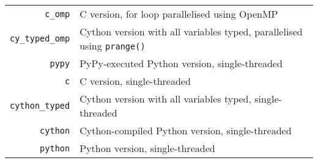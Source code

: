 \noindent\begin{tabular}{rp{\textwidth-99pt}}
	\verb|c_omp|        & C version, for loop parallelised using OpenMP \\
	\verb|cy_typed_omp| & Cython version with all variables typed, parallelised using \verb|prange()| \\
	\verb|pypy|         & PyPy-executed Python version, single-threaded \\
	\verb|c|            & C version, single-threaded \\
	\verb|cython_typed| & Cython version with all variables typed, single-threaded \\
	\verb|cython|       & Cython-compiled Python version, single-threaded \\
	\verb|python|       & Python version, single-threaded \\
\end{tabular}

